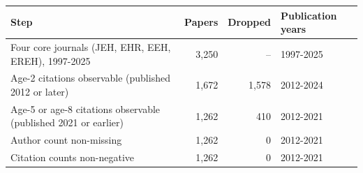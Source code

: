 \begin{tabular}{lrrl}
\toprule
Step & Papers & Dropped & Publication years \\
\midrule
Four core journals (JEH, EHR, EEH, EREH), 1997-2025 & 3,250 & -- & 1997-2025 \\
Age-2 citations observable (published 2012 or later) & 1,672 & 1,578 & 2012-2024 \\
Age-5 or age-8 citations observable (published 2021 or earlier) & 1,262 &   410 & 2012-2021 \\
Author count non-missing & 1,262 &     0 & 2012-2021 \\
Citation counts non-negative & 1,262 &     0 & 2012-2021 \\
\bottomrule
\end{tabular}

